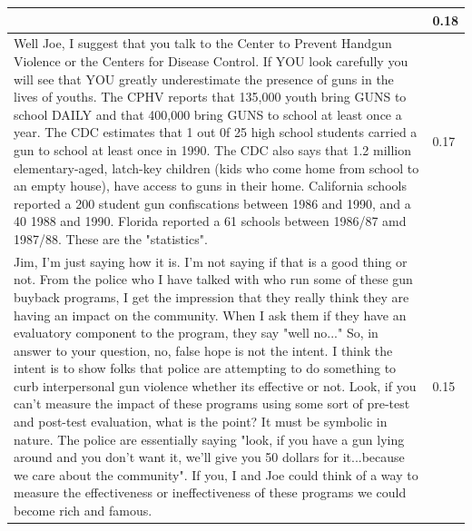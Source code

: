\documentclass{article}
\begin{document}
\begin{table}[ht]
\begin{tabular}{|p{10cm}|p{3cm}| }
  & 0.18 \\
   \hline %
 Well Joe, I suggest that you talk to the Center to Prevent Handgun Violence
or the Centers for Disease Control.  If YOU look carefully you will see
that YOU greatly underestimate the presence of guns in the lives of youths.
The CPHV reports that 135,000 youth bring GUNS to school DAILY and that
400,000 bring GUNS to school at least once a year.  The CDC estimates
that 1 out 0f 25 high school students carried a gun to school at least once
in 1990.  The CDC also says that 1.2 million elementary-aged, latch-key
children (kids who come home from school to an empty house), have access
to guns in their home.  California schools reported a 200%
student gun confiscations between 1986 and 1990, and a 40%
1988 and 1990.  Florida reported a 61%
schools between 1986/87 amd 1987/88.  These are the "statistics".


  & 0.17 \\
   \hline %
   Jim, I'm just saying how it is.  I'm not saying if that is a good thing
or not. From the police who I have talked with who run some of these gun
buyback programs, I get the impression that they really think they are
having an impact on the community.  When I ask them if they have an evaluatory
component to the program, they say "well no..."  So, in answer to your
question, no, false hope is not the intent.  I think the intent is to
show folks that police are attempting to do something to curb interpersonal
gun violence whether its effective or not.  Look, if you can't measure
the impact of these programs using some sort of pre-test and post-test
evaluation, what is the point?  It must be symbolic in nature.  The police are
essentially saying "look, if you have a gun lying around and you don't
want it, we'll give you 50 dollars for it...because we care about the community".
If you, I and Joe could think of a way to measure the effectiveness or
ineffectiveness of these programs we could become rich and famous.


  & 0.15 \\
  [1ex] %
\hline %
\end{tabular}
\label{table:nonlin} %
\end{table}

\maketitle
\end{document}
